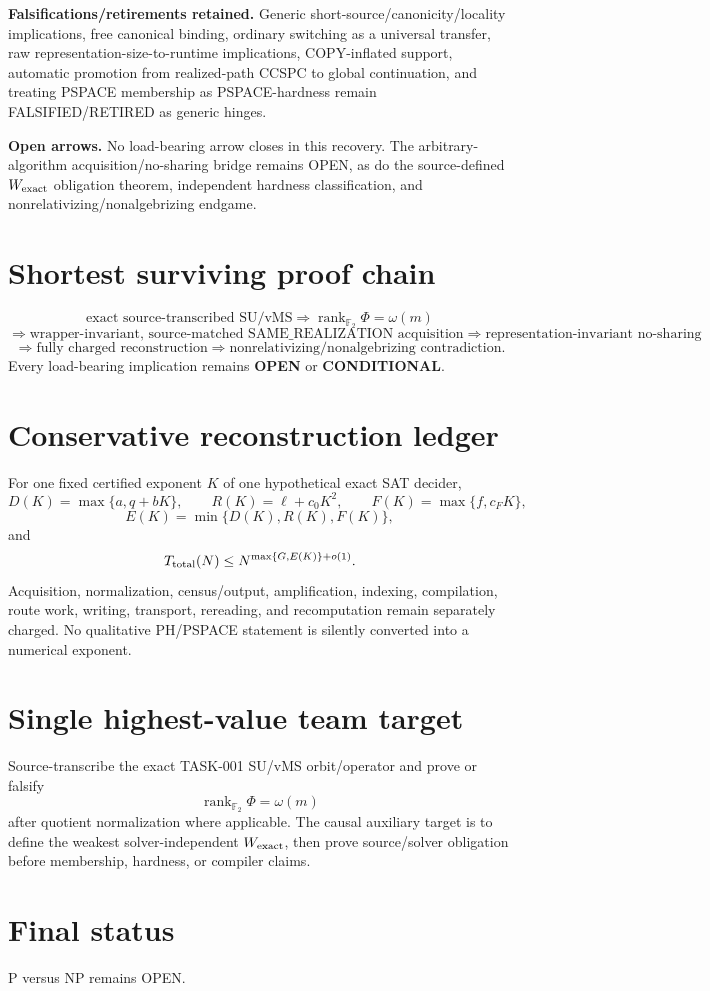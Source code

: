 \documentclass[11pt]{article}
\begin{document}
\textbf{Falsifications/retirements retained.}
Generic short-source/canonicity/locality implications, free canonical binding, ordinary switching as a universal transfer, raw representation-size-to-runtime implications, COPY-inflated support, automatic promotion from realized-path CCSPC to global continuation, and treating PSPACE membership as PSPACE-hardness remain FALSIFIED/RETIRED as generic hinges.

\textbf{Open arrows.}
No load-bearing arrow closes in this recovery. The arbitrary-algorithm acquisition/no-sharing bridge remains OPEN, as do the source-defined \(W_{\rm exact}\) obligation theorem, independent hardness classification, and nonrelativizing/nonalgebrizing endgame.

\section*{Shortest surviving proof chain}
\[
\text{exact source-transcribed SU/vMS}
\Longrightarrow
\operatorname{rank}_{\mathbb F_2}\Phi=\omega(m)
\]
\[
\Longrightarrow
\boxed{\text{wrapper-invariant, source-matched SAME\_REALIZATION acquisition}}
\Longrightarrow
\text{representation-invariant no-sharing}
\]
\[
\Longrightarrow
\text{fully charged reconstruction}
\Longrightarrow
\text{nonrelativizing/nonalgebrizing contradiction}.
\]
Every load-bearing implication remains \textbf{OPEN} or \textbf{CONDITIONAL}.

\section*{Conservative reconstruction ledger}
For one fixed certified exponent \(K\) of one hypothetical exact SAT decider,
\[
D(K)=\max\{a,q+bK\},\qquad
R(K)=\ell+c_0K^2,\qquad
F(K)=\max\{f,c_FK\},
\]
\[
E(K)=\min\{D(K),R(K),F(K)\},
\]
and
\[
T_{\rm total}(N)\le N^{\max\{G,E(K)\}+o(1)}.
\]
Acquisition, normalization, census/output, amplification, indexing, compilation, route work, writing, transport, rereading, and recomputation remain separately charged. No qualitative PH/PSPACE statement is silently converted into a numerical exponent.

\section*{Single highest-value team target}
Source-transcribe the exact TASK-001 SU/vMS orbit/operator and prove or falsify
\[
\boxed{\operatorname{rank}_{\mathbb F_2}\Phi=\omega(m)}
\]
after quotient normalization where applicable. The causal auxiliary target is to define the weakest solver-independent \(W_{\rm exact}\), then prove source/solver obligation before membership, hardness, or compiler claims.

\section*{Final status}
P versus NP remains OPEN.

\end{document}
